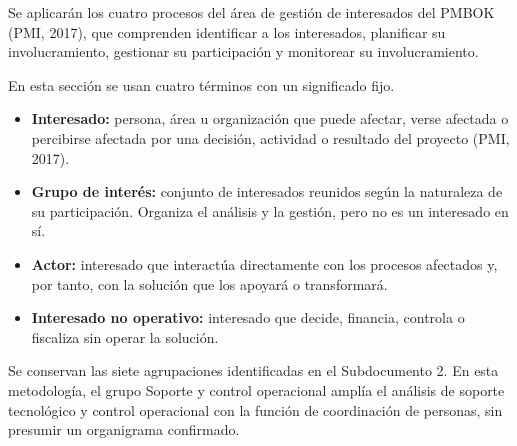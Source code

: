 \documentclass[11pt]{article}
\begin{document}
Se aplicarán los cuatro procesos del área de gestión de interesados del
PMBOK (PMI, 2017), que comprenden identificar a los interesados,
planificar su involucramiento, gestionar su participación y monitorear
su involucramiento.

En esta sección se usan cuatro términos con un significado fijo.

\begin{itemize}
\item
  \textbf{Interesado:} persona, área u organización que puede afectar,
  verse afectada o percibirse afectada por una decisión, actividad o
  resultado del proyecto (PMI, 2017).
\item
  \textbf{Grupo de interés:} conjunto de interesados reunidos según la
  naturaleza de su participación. Organiza el análisis y la gestión,
  pero no es un interesado en sí.
\item
  \textbf{Actor:} interesado que interactúa directamente con los
  procesos afectados y, por tanto, con la solución que los apoyará o
  transformará.
\item
  \textbf{Interesado no operativo:} interesado que decide, financia,
  controla o fiscaliza sin operar la solución.
\end{itemize}

Se conservan las siete agrupaciones identificadas en el Subdocumento 2.
En esta metodología, el grupo Soporte y control operacional amplía el
análisis de soporte tecnológico y control operacional con la función de
coordinación de personas, sin presumir un organigrama confirmado.
\end{document}
